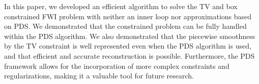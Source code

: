 In this paper, we developed an efficient algorithm to solve the TV and box constrained FWI problem with neither an inner loop nor approximations based on PDS.
We demonstrated that the constrained problem can be fully handled within the PDS algorithm.
We also demonstrated that the piecewise smoothness by the TV constraint is well represented even when the PDS algorithm is used, and that efficient and accurate reconstruction is possible.
Furthermore, the PDS framework allows for the incorporation of more complex constraints and regularizations, making it a valuable tool for future research.
